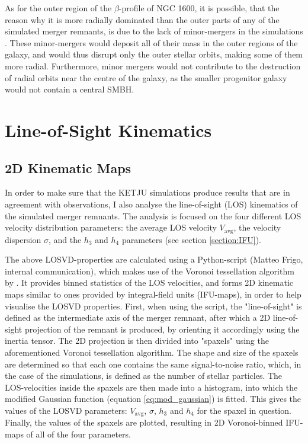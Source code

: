 \documentclass[english, twoside]{HYgradu}
\begin{document}
As for the outer region of the $\beta$-profile of NGC 1600, it is possible, that the reason why it is more radially dominated than the outer parts of any of the simulated merger remnants, is due to the lack of minor-mergers in the simulations \citep{Rantala2018}. These minor-mergers would deposit all of their mass in the outer regions of the galaxy, and would thus disrupt only the outer stellar orbits, making some of them more radial. Furthermore, minor mergers would not contribute to the destruction of radial orbits near the centre of the galaxy, as the smaller progenitor galaxy would not contain a central SMBH.

\section{Line-of-Sight Kinematics}

\subsection{2D Kinematic Maps}

In order to make sure that the KETJU simulations produce results that are in agreement with observations, I also analyse the line-of-sight (LOS) kinematics of the simulated merger remnants. The analysis is focused on the four different LOS velocity distribution parameters: the average LOS velocity $V_\mathrm{avg}$, the velocity dispersion $\sigma$, and the $h_3$ and $h_4$ parameters (see section \ref{section:IFU}). 

The above LOSVD-properties are calculated using a Python-script (Matteo Frigo, internal communication), which makes use of the Voronoi tessellation algorithm by \cite{Cappellari2003}. It provides binned statistics of the LOS velocities, and forms 2D kinematic maps similar to ones provided by integral-field units (IFU-maps), in order to help visualise the LOSVD properties. First, when using the script, the "line-of-sight" is defined as the intermediate axis of the merger remnant, after which a 2D line-of-sight projection of the remnant is produced, by orienting it accordingly using the inertia tensor. The 2D projection is then divided into "spaxels" using the aforementioned Voronoi tessellation algorithm. The shape and size of the spaxels are determined so that each one contains the same signal-to-noise ratio, which, in the case of the simulations, is defined as the number of stellar particles. The LOS-velocities inside the spaxels are then made into a histogram, into which the modified Gaussian function (equation \ref{eq:mod_gaussian}) is fitted. This gives the values of the LOSVD parameters: $V_\mathrm{avg}$, $\sigma$, $h_3$ and $h_4$ for the spaxel in question. Finally, the values of the spaxels are plotted, resulting in 2D Voronoi-binned IFU-maps of all of the four parameters.
\end{document}
